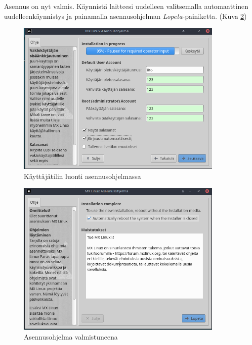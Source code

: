 \documentclass[a4paper, 12pt, finnish]{article}
\begin{document}
Asennus on nyt valmis. Käynnistä laitteesi uudelleen valitsemalla automaattinen uudelleenkäynnistys ja painamalla asennusohjelman \textit{Lopeta}-painiketta. (Kuva \ref{fig:valmis2})

\begin{figure}[htpb]
    \begin{center}
        \includegraphics[width=0.899\textwidth]{asen/asennus_user}
        \caption{Käyttäjätilin luonti asennusohjelmassa}
        \label{fig:user}
    \end{center}
\end{figure}

\begin{figure}[htpb]
    \begin{center}
        \includegraphics[width=0.899\textwidth]{asen/asennus_valmis}
        \caption{Asennusohjelma valmistuneena}
        \label{fig:valmis2}
    \end{center}
\end{figure}
\end{document}
